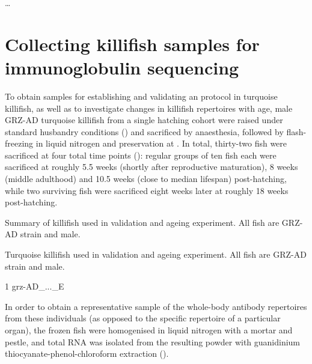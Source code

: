 

\dots

\section{Collecting killifish samples for immunoglobulin sequencing}
\label{sec:igseq_samples}

To obtain samples for establishing and validating an \Igseq protocol in turquoise killifish, as well as to investigate changes in killifish repertoires with age, male GRZ-AD turquoise killifish from a single hatching cohort were raised under standard husbandry conditions () and sacrificed by anaesthesia, followed by flash-freezing in liquid nitrogen and preservation at . In total, thirty-two fish were sacrificed at four total time points (): regular groups of ten fish each were sacrificed at roughly 5.5 weeks (shortly after reproductive maturation), 8 weeks (middle adulthood) and 10.5 weeks (close to median lifespan) post-hatching, while two surviving fish were sacrificed eight weeks later at roughly 18 weeks post-hatching.

\begin{table}
\caption{Summary of killifish used in \igseq validation and ageing experiment. All fish are GRZ-AD strain and male.}
\label{tab:igseq-cohorts-summary}

\end{table}

\begin{table}
\caption{Turquoise killifish used in \igseq validation and ageing experiment. All fish are GRZ-AD strain and male.}
\label{tab:igseq-cohorts-fish}
\begin{threeparttable}

\begin{tablenotes}
\item[1] grz-AD\_...\_E
\end{tablenotes}
\end{threeparttable}
\end{table}

In order to obtain a representative sample of the whole-body antibody repertoires from these individuals (as opposed to the specific repertoire of a particular organ), the frozen fish were homogenised in liquid nitrogen with a mortar and pestle, and total RNA was isolated from the resulting powder with guanidinium thiocyanate-phenol-chloroform extraction ().

